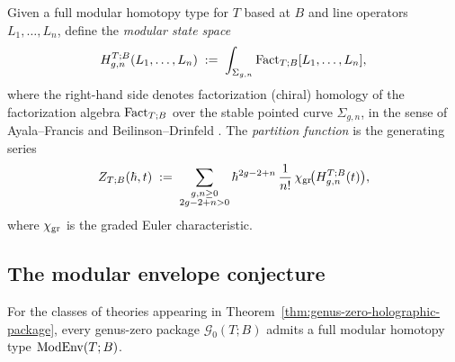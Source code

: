 \begin{definition}
Given a full modular homotopy type for $T$ based at $B$ and line operators
$L_1,\dots,L_n$, define the \emph{modular state space}
\begin{equation}
H_{g,n}^{T;B}(L_1,\dots,L_n)
\;:=\;
\int_{\Sigma_{g,n}}\operatorname{Fact}_{T;B}[L_1,\dots,L_n],
\end{equation}
where the right-hand side denotes factorization (chiral) homology of the factorization algebra
$\operatorname{Fact}_{T;B}$ over the stable pointed curve $\Sigma_{g,n}$, in the sense of Ayala--Francis
\cite{AF15} and Beilinson--Drinfeld \cite{BD04}. The \emph{partition function} is the
generating series
\begin{equation}
Z_{T;B}(\hbar,t)
\;:=\;
\sum_{\substack{g,n\ge 0\\2g-2+n>0}}
\hbar^{2g-2+n}\,\frac{1}{n!}\,\chi_{\operatorname{gr}}\!\bigl(H_{g,n}^{T;B}(t)\bigr),
\end{equation}
where $\chi_{\operatorname{gr}}$ is the graded Euler characteristic.
\end{definition}

\subsection{The modular envelope conjecture}

\begin{conjecture}
For the classes of theories appearing in Theorem~\ref{thm:genus-zero-holographic-package},
every genus-zero package $\mathcal G_0(T;B)$ admits a full modular homotopy type
$\operatorname{ModEnv}(T;B)$.
\end{conjecture}

